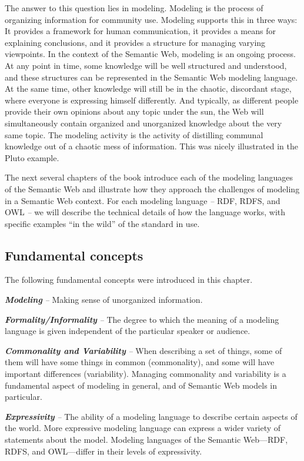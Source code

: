 The answer to this question lies in modeling. Modeling is the process of
organizing information for community use. Modeling supports this in
three ways: It provides a framework for human communication, it provides
a means for explaining conclusions, and it provides a structure for
managing varying viewpoints. In the context of the Semantic Web,
modeling is an ongoing process. At any point in time, some knowledge
will be well structured and understood, and these structures can be
represented in the Semantic Web modeling language. At the same time,
other knowledge will still be in the chaotic, discordant stage, where
everyone is expressing himself differently. And typically, as different
people provide their own opinions about any topic under the sun, the Web
will simultaneously contain organized and unorganized knowledge about
the very same topic. The modeling activity is the activity of distilling
communal knowledge out of a chaotic mess of information. This was nicely
illustrated in the Pluto example.

The next several chapters of the book introduce each of the modeling
languages of the Semantic
Web and illustrate how they approach the challenges of modeling in a
Semantic Web context. For each
modeling language \emph{--} RDF, RDFS, and OWL \emph{--} we will
describe the technical details of how the language works, with specific
examples ``in the wild'' of the standard in use.

\subsection{Fundamental concepts}

The following fundamental concepts were introduced in this chapter.

\emph{\textbf{Modeling}} \emph{--} Making sense of unorganized
information.

\emph{\textbf{Formality/Informality}} \emph{--} The degree to which the
meaning of a modeling language is given independent of the particular
speaker or audience.

\emph{\textbf{Commonality and Variability}} \emph{--} When describing a
set of things, some of them will have some things in common
(commonality), and some will have important differences (variability).
Managing commonality and variability is a fundamental aspect of modeling
in general, and of Semantic Web models in particular.

\emph{\textbf{Expressivity}} \emph{--} The ability of a modeling
language to describe certain aspects of the world. More expressive
modeling language can express a wider variety of statements about the
model. Modeling languages of the Semantic Web---RDF, RDFS, and
OWL---differ in their levels of expressivity.
